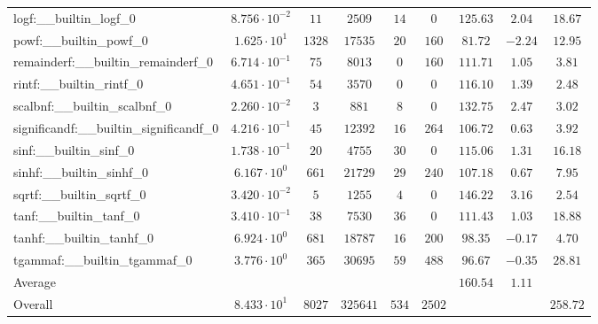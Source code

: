 \begin{tabular}{|l|c|c|c|c|c|c|c|c|}
logf:\_\_builtin\_logf\_0                 & $ 8.756 \cdot 10^{-2} $ & $ 11     $ & $ 2509   $ & $ 14  $ & $ 0    $ & $ 125.63      $ & $ 2.04    $ & $ 18.67   $ \\
powf:\_\_builtin\_powf\_0                 & $ 1.625 \cdot 10^{1}  $ & $ 1328   $ & $ 17535  $ & $ 20  $ & $ 160  $ & $ 81.72       $ & $ -2.24   $ & $ 12.95   $ \\
remainderf:\_\_builtin\_remainderf\_0     & $ 6.714 \cdot 10^{-1} $ & $ 75     $ & $ 8013   $ & $ 0   $ & $ 160  $ & $ 111.71      $ & $ 1.05    $ & $ 3.81    $ \\
rintf:\_\_builtin\_rintf\_0               & $ 4.651 \cdot 10^{-1} $ & $ 54     $ & $ 3570   $ & $ 0   $ & $ 0    $ & $ 116.10      $ & $ 1.39    $ & $ 2.48    $ \\
scalbnf:\_\_builtin\_scalbnf\_0           & $ 2.260 \cdot 10^{-2} $ & $ 3      $ & $ 881    $ & $ 8   $ & $ 0    $ & $ 132.75      $ & $ 2.47    $ & $ 3.02    $ \\
significandf:\_\_builtin\_significandf\_0 & $ 4.216 \cdot 10^{-1} $ & $ 45     $ & $ 12392  $ & $ 16  $ & $ 264  $ & $ 106.72      $ & $ 0.63    $ & $ 3.92    $ \\
sinf:\_\_builtin\_sinf\_0                 & $ 1.738 \cdot 10^{-1} $ & $ 20     $ & $ 4755   $ & $ 30  $ & $ 0    $ & $ 115.06      $ & $ 1.31    $ & $ 16.18   $ \\
sinhf:\_\_builtin\_sinhf\_0               & $ 6.167 \cdot 10^{0}  $ & $ 661    $ & $ 21729  $ & $ 29  $ & $ 240  $ & $ 107.18      $ & $ 0.67    $ & $ 7.95    $ \\
sqrtf:\_\_builtin\_sqrtf\_0               & $ 3.420 \cdot 10^{-2} $ & $ 5      $ & $ 1255   $ & $ 4   $ & $ 0    $ & $ 146.22      $ & $ 3.16    $ & $ 2.54    $ \\
tanf:\_\_builtin\_tanf\_0                 & $ 3.410 \cdot 10^{-1} $ & $ 38     $ & $ 7530   $ & $ 36  $ & $ 0    $ & $ 111.43      $ & $ 1.03    $ & $ 18.88   $ \\
tanhf:\_\_builtin\_tanhf\_0               & $ 6.924 \cdot 10^{0}  $ & $ 681    $ & $ 18787  $ & $ 16  $ & $ 200  $ & $ 98.35       $ & $ -0.17   $ & $ 4.70    $ \\
tgammaf:\_\_builtin\_tgammaf\_0           & $ 3.776 \cdot 10^{0}  $ & $ 365    $ & $ 30695  $ & $ 59  $ & $ 488  $ & $ 96.67       $ & $ -0.35   $ & $ 28.81   $ \\
\hline
Average                                   & $                     $ & $        $ & $        $ & $     $ & $      $ & $ 160.54      $ & $ 1.11    $ & $         $ \\
\hline
Overall                                   & $ 8.433 \cdot 10^{1}  $ & $ 8027   $ & $ 325641 $ & $ 534 $ & $ 2502 $ & $             $ & $         $ & $ 258.72  $ \\
\hline
\end{tabular}
